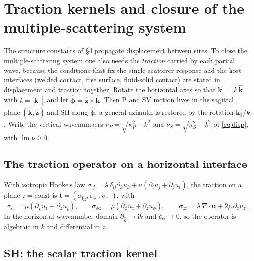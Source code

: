 \documentclass[11pt,a4paper]{article}
\newcommand{\ii}{\mathrm{i}}
\newcommand{\Imm}{\operatorname{Im}}
\newcommand{\kpar}{\mathbf{k}_{\parallel}}
\begin{document}
\section{Traction kernels and closure of the multiple-scattering system}

The structure constants of \S4 propagate displacement between sites. To close the
multiple-scattering system one also needs the \emph{traction} carried by each partial wave,
because the conditions that fix the single-scatterer response and the host interfaces
(welded contact, free surface, fluid-solid contact) are stated in displacement and traction
together. Rotate the horizontal axes so that $\kpar=k\,\hat{\mathbf{k}}$ with $k=|\kpar|$, and
let $\hat{\boldsymbol{\phi}}=\hat{\mathbf{z}}\times\hat{\mathbf{k}}$. Then P and SV motion lives
in the sagittal plane $(\hat{\mathbf{k}},\hat{\mathbf{z}})$ and SH along
$\hat{\boldsymbol{\phi}}$; a general azimuth is restored by the rotation $\kpar/k$. Write the
vertical wavenumbers $\nu_P=\sqrt{\kappa_P^{2}-k^{2}}$ and $\nu_S=\sqrt{\kappa_S^{2}-k^{2}}$ of
\eqref{eq:disp}, with $\Imm\nu\ge 0$.

\subsection{The traction operator on a horizontal interface}

With isotropic Hooke's law
$\sigma_{ij}=\lambda\,\delta_{ij}\partial_k u_k+\mu(\partial_i u_j+\partial_j u_i)$, the
traction on a plane $z=\mathrm{const}$ is $\mathbf{t}=(\sigma_{\hat k z},\sigma_{\phi z},
\sigma_{zz})$, with
\begin{equation}
\sigma_{\hat k z}=\mu(\partial_{\hat k}u_z+\partial_z u_{\hat k}),\qquad
\sigma_{\phi z}=\mu(\partial_\phi u_z+\partial_z u_\phi),\qquad
\sigma_{zz}=\lambda\,\nabla\!\cdot\!\mathbf{u}+2\mu\,\partial_z u_z .
\end{equation}
In the horizontal-wavenumber domain $\partial_{\hat k}\to\ii k$ and $\partial_\phi\to 0$, so
the operator is algebraic in $k$ and differential in $z$.

\subsection{SH: the scalar traction kernel}
\end{document}
